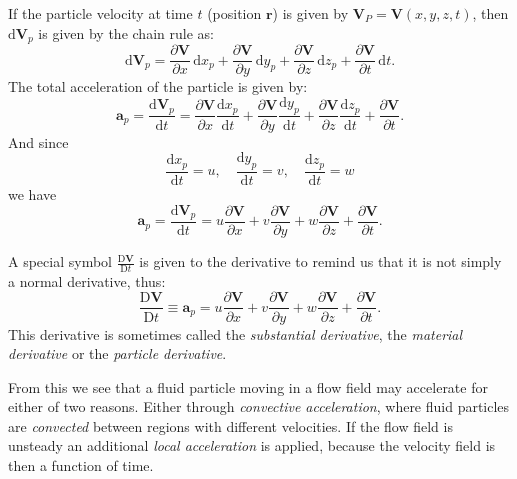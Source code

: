 If the particle velocity at time $t$ (position $\textbf{r}$) is given by $\textbf{V}_P = \textbf{V}(x,y,z,t)$, then $\mathrm{d}\textbf{V}_p$ is given by the chain rule as:
\[ 
\mathrm{d}\textbf{V}_p = \frac{\partial \textbf{V}}{\partial x} \, \mathrm{d}x_p + \frac{\partial \textbf{V}}{\partial y} \, \mathrm{d}y_p + \frac{\partial \textbf{V}}{\partial z} \, \mathrm{d}z_p + \frac{\partial \textbf{V}}{\partial t}\, \mathrm{d}t 
.\]
The total acceleration of the particle is given by:
\[ 
\textbf{a}_p = \frac{\mathrm{d}\textbf{V}_p}{\mathrm{d}t} = \frac{\partial \textbf{V}}{\partial x} \frac{\mathrm{d}x_p}{\mathrm{d}t} + \frac{\partial \textbf{V}}{\partial y} \frac{\mathrm{d}y_p}{\mathrm{d}t} + \frac{\partial \textbf{V}}{\partial z} \frac{\mathrm{d}z_p}{\mathrm{d}t} + \frac{\partial \textbf{V}}{\partial t}
.\]
And since
\[ 
\frac{\mathrm{d}x_p}{\mathrm{d}t} = u, \quad \frac{\mathrm{d}y_p}{\mathrm{d}t} = v, \quad \frac{\mathrm{d}z_p}{\mathrm{d}t} = w
\]
we have
\[ 
  \textbf{a}_p = \frac{\mathrm{d}\textbf{V}_p}{\mathrm{d}t} = u \frac{\partial \textbf{V}}{\partial x} + v \frac{\partial \textbf{V}}{\partial y} + w \frac{\partial \textbf{V}}{\partial z} + \frac{\partial \textbf{V}}{\partial t} 
.\]

A special symbol $\frac{\mathrm{D}\textbf{V}}{\mathrm{D}t}$ is given to the derivative to remind us that it is not simply a normal derivative, thus:
\[ 
\frac{\mathrm{D}\textbf{V}}{\mathrm{D}t} \equiv \textbf{a}_p = u \frac{\partial \textbf{V}}{\partial x} + v \frac{\partial \textbf{V}}{\partial y} + w \frac{\partial \textbf{V}}{\partial z} + \frac{\partial \textbf{V}}{\partial t}
.\]
This derivative is sometimes called the \textit{substantial derivative}, the \textit{material derivative} or the \textit{particle derivative}. 

From this we see that a fluid particle moving in a flow field may accelerate for either of two reasons. Either through \textit{convective acceleration}, where fluid particles are \textit{convected} between regions with different velocities. If the flow field is unsteady an additional \textit{local acceleration} is applied, because the velocity field is then a function of time.

